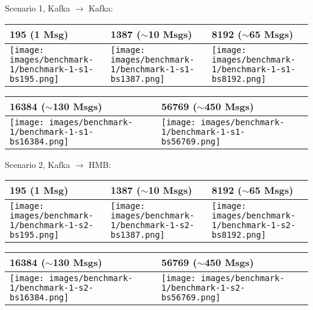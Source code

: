 Scenario 1, Kafka $\rightarrow$ Kafka:

\begin{table}[H]
\centering
\begin{tabular}{|l|l|l|} \hline
195 (1 Msg) & 1387 ($\sim$10 Msgs)& 8192 ($\sim$65 Msgs)\\ \hline
\texttt{[image: images/benchmark-1/benchmark-1-s1-bs195.png]}
&
\texttt{[image: images/benchmark-1/benchmark-1-s1-bs1387.png]}
&
\texttt{[image: images/benchmark-1/benchmark-1-s1-bs8192.png]} \\ \hline
\end{tabular}
\end{table}

\begin{table}[H]
\centering
\begin{tabular}{|l|l|} \hline
16384 ($\sim$130 Msgs)& 56769 ($\sim$450 Msgs)\\ \hline
\texttt{[image: images/benchmark-1/benchmark-1-s1-bs16384.png]}
&
\texttt{[image: images/benchmark-1/benchmark-1-s1-bs56769.png]} \\ \hline
\end{tabular}
\end{table}

Scenario 2, Kafka $\rightarrow$ HMB:

\begin{table}[H]
\centering
\begin{tabular}{|l|l|l|} \hline
195 (1 Msg) & 1387 ($\sim$10 Msgs)& 8192 ($\sim$65 Msgs)\\ \hline
\texttt{[image: images/benchmark-1/benchmark-1-s2-bs195.png]}
&
\texttt{[image: images/benchmark-1/benchmark-1-s2-bs1387.png]}
&
\texttt{[image: images/benchmark-1/benchmark-1-s2-bs8192.png]} \\ \hline
\end{tabular}
\end{table}

\begin{table}[H]
\centering
\begin{tabular}{|l|l|} \hline
16384 ($\sim$130 Msgs)& 56769 ($\sim$450 Msgs)\\ \hline
\texttt{[image: images/benchmark-1/benchmark-1-s2-bs16384.png]}
&
\texttt{[image: images/benchmark-1/benchmark-1-s2-bs56769.png]} \\ \hline
\end{tabular}
\end{table}

